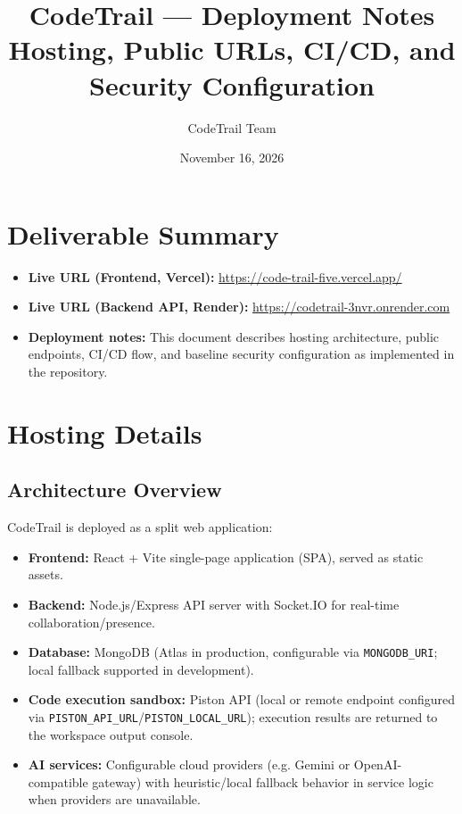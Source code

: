 ﻿\documentclass[11pt,a4paper]{article}
\title{CodeTrail --- Deployment Notes\\\large Hosting, Public URLs, CI/CD, and Security Configuration}
\author{CodeTrail Team}
\date{November 16, 2026}
\begin{document}
\maketitle

\section*{Deliverable Summary}
\begin{itemize}[leftmargin=*]
  \item \textbf{Live URL (Frontend, Vercel):} \url{https://code-trail-five.vercel.app/}
  \item \textbf{Live URL (Backend API, Render):} \url{https://codetrail-3nvr.onrender.com}
  \item \textbf{Deployment notes:} This document describes hosting architecture, public endpoints, CI/CD flow, and baseline security configuration as implemented in the repository.
\end{itemize}

\vspace{0.5em}

\section{Hosting Details}

\subsection{Architecture Overview}
CodeTrail is deployed as a split web application:

\vspace{0.2em}
\begin{itemize}[leftmargin=*]
  \item \textbf{Frontend:} React + Vite single-page application (SPA), served as static assets.
  \item \textbf{Backend:} Node.js/Express API server with Socket.IO for real-time collaboration/presence.
  \item \textbf{Database:} MongoDB (Atlas in production, configurable via \texttt{MONGODB\_URI}; local fallback supported in development).
  \item \textbf{Code execution sandbox:} Piston API (local or remote endpoint configured via \texttt{PISTON\_API\_URL}/\texttt{PISTON\_LOCAL\_URL}); execution results are returned to the workspace output console.
  \item \textbf{AI services:} Configurable cloud providers (e.g. Gemini or OpenAI-compatible gateway) with heuristic/local fallback behavior in service logic when providers are unavailable.
\end{itemize}
\end{document}
